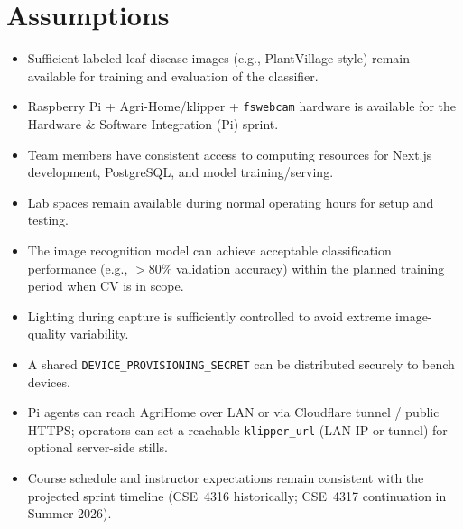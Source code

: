 \documentclass[11pt,letterpaper]{article}
\begin{document}
\section{Assumptions}
\begin{itemize}
  \item Sufficient labeled leaf disease images (e.g., PlantVillage-style) remain available for training
        and evaluation of the classifier.
  \item Raspberry Pi + Agri-Home/klipper + \texttt{fswebcam} hardware is available for the Hardware \&
        Software Integration (Pi) sprint.
  \item Team members have consistent access to computing resources for Next.js development,
        PostgreSQL, and model training/serving.
  \item Lab spaces remain available during normal operating hours for setup and testing.
  \item The image recognition model can achieve acceptable classification performance (e.g.,
        $>$80\% validation accuracy) within the planned training period when CV is in scope.
  \item Lighting during capture is sufficiently controlled to avoid extreme image-quality variability.
  \item A shared \texttt{DEVICE\_PROVISIONING\_SECRET} can be distributed securely to bench devices.
  \item Pi agents can reach AgriHome over LAN or via Cloudflare tunnel / public HTTPS; operators
        can set a reachable \texttt{klipper\_url} (LAN IP or tunnel) for optional server-side stills.
  \item Course schedule and instructor expectations remain consistent with the projected sprint
        timeline (CSE~4316 historically; CSE~4317 continuation in Summer 2026).
\end{itemize}
\end{document}
